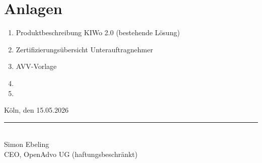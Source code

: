 \chapter{Anlagen}

\begin{enumerate}
  \item Produktbeschreibung KIWo 2.0 (bestehende Lösung)
  \item Zertifizierungsübersicht Unterauftragnehmer
  \item AVV-Vorlage
  \item {}
  \item {}
\end{enumerate}

\vfill
\noindent
Köln, den 15.05.2026

\bigskip\bigskip
\noindent
\rule{6cm}{0.4pt}\\
Simon Ebeling\\
CEO, OpenAdvo UG (haftungsbeschränkt)
